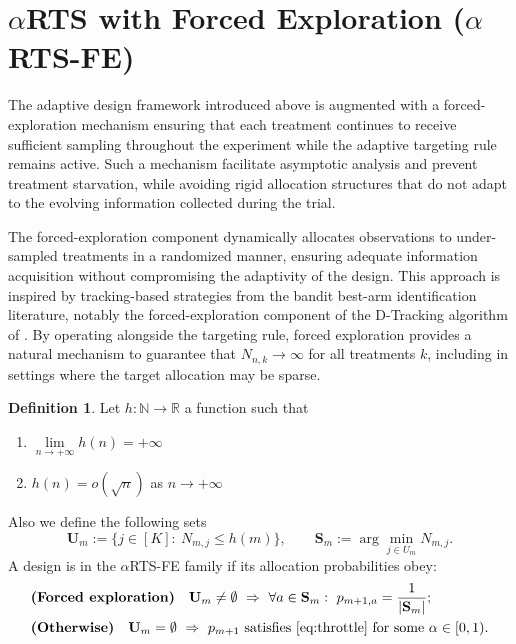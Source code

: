 \documentclass[11pt]{article}
\theoremstyle{plain}
\theoremstyle{definition}
\newtheorem{definition}{Definition}[section]
\begin{document}
	
	\section{$\alpha$RTS with Forced Exploration ($\alpha$RTS-FE)}\label{sec:alpha-rts-fe}

The adaptive design framework introduced above is augmented with a forced-exploration mechanism ensuring that each treatment continues to receive sufficient sampling throughout the experiment while the adaptive targeting rule remains active. Such a mechanism facilitate asymptotic analysis and prevent treatment starvation, while avoiding rigid allocation structures that do not adapt to the evolving information collected during the trial.

The forced-exploration component dynamically allocates observations to under-sampled
treatments in a randomized manner, ensuring adequate information acquisition without
compromising the adaptivity of the design. This approach is inspired by tracking-based
strategies from the bandit best-arm identification literature, notably the forced-exploration
component of the D-Tracking algorithm of \cite{garivier2016optimal}. By operating
alongside the targeting rule, forced exploration provides a natural mechanism to
guarantee that $N_{n,k}\to\infty$ for all treatments $k$, including in settings where
the target allocation may be sparse.
 
\begin{definition}\label{def:rts-fe-def}
	Let $h:\mathbb{N}\to\mathbb{R}$ a function such that
	\begin{enumerate}[label=(\roman*)]
		\item $\lim\limits_{n \to +\infty} h(n) = +\infty$
		\item $h(n)=o(\sqrt{n})$ as \(n \to +\infty\)
	\end{enumerate}
	
	
%	

	
	Also we define the following sets
	\begin{equation}
		\mathbf{U}_m:=\{j\in[K]:\ N_{m,j}\le h(m)\},\qquad \mathbf{S}_m:=\arg\min_{j\in U_m} N_{m,j}.
	\end{equation}
	A design is in the \(\alpha\)RTS-FE family if its allocation probabilities obey:
	\begin{align}
		&\textbf{(Forced exploration)}\quad \mathbf{U}_m\neq\emptyset\ \Rightarrow\ \forall a\in \mathbf{S}_m:\ p_{m+1,a}=\frac{1}{|\mathbf{S}_m|};\label{eq:fe-phase}\\
		&\textbf{(Otherwise)}\quad \mathbf{U}_m=\emptyset\ \Rightarrow\ \text{$p_{m+1}$ satisfies \eqref{eq:throttle} for some $\alpha\in[0,1)$}.\label{eq:fe-otherwise}
	\end{align}
\end{definition}
\end{document}
